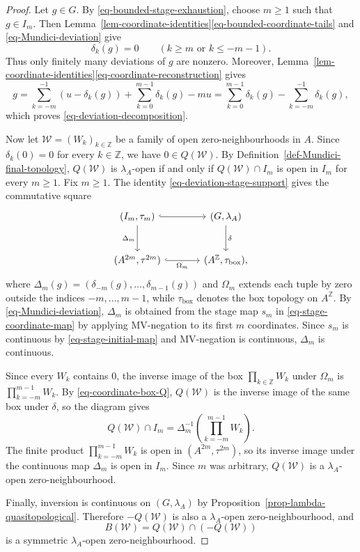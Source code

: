 \documentclass[preprint,3p]{elsarticle}
\theoremstyle{plain}
\theoremstyle{definition}
\numberwithin{equation}{section}
\begin{document}
\begin{proof}
Let $g\in G$.  By \eqref{eq-bounded-stage-exhaustion}, choose $m\geq1$
such that $g\in I_m$.  Then
Lemma~\ref{lem-coordinate-identities}\ref{eq-bounded-coordinate-tails} and
\eqref{eq-Mundici-deviation} give
\begin{equation}
\label{eq-deviation-stage-support}
 \delta_k(g)=0
 \qquad
 (k\geq m\text{ or }k\leq-m-1).
\end{equation}
Thus only finitely many deviations of $g$ are nonzero.  Moreover,
Lemma~\ref{lem-coordinate-identities}\ref{eq-coordinate-reconstruction} gives
\[
g
=\sum_{k=-m}^{-1}(u-\delta_k(g))
  +\sum_{k=0}^{m-1}\delta_k(g)-mu
 =\sum_{k=0}^{m-1}\delta_k(g)
  -\sum_{k=-m}^{-1}\delta_k(g),
\]
which proves \eqref{eq-deviation-decomposition}.

Now let $\mathcal W=(W_k)_{k\in\mathbb Z}$ be a family of open
zero-neighbourhoods in $A$.
Since $\delta_k(0)=0$ for every $k\in\mathbb Z$, we have
$0\in Q(\mathcal W)$.
By Definition~\ref{def-Mundici-final-topology}, $Q(\mathcal W)$ is
$\lambda_A$-open if and only if $Q(\mathcal W)\cap I_m$ is open
in $I_m$ for every $m\geq1$.
Fix $m\geq1$.  The identity \eqref{eq-deviation-stage-support}
gives the commutative square
\[
\begin{tikzcd}[column sep=large,row sep=large]
 (I_m,\tau_m) \arrow[r,hook] \arrow[d,"\Delta_m"'] &
 (G,\lambda_A) \arrow[d,"\delta"] \\
 (A^{2m},\tau^{2m}) \arrow[r,hook,"\Omega_m"'] &
 (A^{\mathbb Z},\tau_{\mathrm{box}}),
\end{tikzcd}
\]
where $\Delta_m(g)=(\delta_{-m}(g),\ldots,\delta_{m-1}(g))$ and
$\Omega_m$ extends each tuple by zero outside the indices
$-m,\ldots,m-1$, while $\tau_{\mathrm{box}}$ denotes the box topology
on $A^{\mathbb Z}$.
By \eqref{eq-Mundici-deviation}, $\Delta_m$ is obtained from the
stage map $s_m$ in \eqref{eq-stage-coordinate-map} by applying
MV-negation to its first $m$ coordinates.  Since $s_m$ is continuous
by \eqref{eq-stage-initial-map} and MV-negation is continuous,
$\Delta_m$ is continuous.

Since every $W_k$ contains $0$, the inverse image of the box
$\prod_{k\in\mathbb Z}W_k$ under $\Omega_m$ is
$\prod_{k=-m}^{m-1}W_k$.
By \eqref{eq-coordinate-box-Q}, $Q(\mathcal W)$ is the inverse image
of the same box under $\delta$, so the diagram gives
\[
 Q(\mathcal W)\cap I_m
 =
 \Delta_m^{-1}\left(\prod_{k=-m}^{m-1}W_k\right).
\]
The finite product $\prod_{k=-m}^{m-1}W_k$ is open in
$(A^{2m},\tau^{2m})$, so its inverse image under the continuous map
$\Delta_m$ is open in $I_m$.
Since $m$ was arbitrary, $Q(\mathcal W)$ is a
$\lambda_A$-open zero-neighbourhood.

Finally, inversion is continuous on $(G,\lambda_A)$ by
Proposition~\ref{prop-lambda-quasitopological}.  Therefore
$-Q(\mathcal W)$ is also a $\lambda_A$-open zero-neighbourhood, and
\[
 B(\mathcal W)=Q(\mathcal W)\cap(-Q(\mathcal W))
\]
is a symmetric $\lambda_A$-open zero-neighbourhood.
\end{proof}
\end{document}
